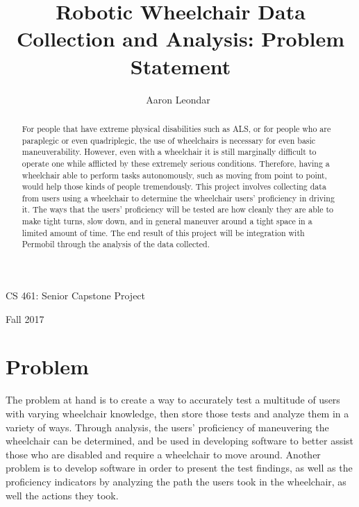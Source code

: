 \documentclass[10pt, onecolumn]{IEEEtran}
\title{Robotic Wheelchair Data Collection and Analysis: Problem Statement}
\author{
    Aaron Leondar\
}
\begin{document}
\begin{titlepage}
    \centering
    \maketitle
    CS 461: Senior Capstone Project\par
    \vspace{.5cm}
    Fall 2017\par
    \vspace{1.5cm}
    \begin{abstract}
        For people that have extreme physical disabilities such as ALS, or for people who are paraplegic or even quadriplegic, the use of wheelchairs is necessary for even basic maneuverability. However, even with a wheelchair it is still marginally difficult to operate one while afflicted by these extremely serious conditions. Therefore, having a wheelchair able to perform tasks autonomously, such as moving from point to point, would help those kinds of people tremendously. This project involves collecting data from users using a wheelchair to determine the wheelchair users' proficiency in driving it.  The ways that the users' proficiency will be tested are how cleanly they are able to make tight turns, slow down, and in general maneuver around a tight space in a limited amount of time. The end result of this project will be integration with Permobil through the analysis of the data collected.
    \end{abstract}
    \newpage  
\end{titlepage}

    \section{Problem}
    
    The problem at hand is to create a way to accurately test a multitude of users with varying wheelchair knowledge, then store those tests and analyze them in a variety of ways. Through analysis, the users' proficiency of maneuvering the wheelchair can be determined, and be used in developing software to better assist those who are disabled and require a wheelchair to move around. Another problem is to develop software in order to present the test findings, as well as the proficiency indicators by analyzing the path the users took in the wheelchair, as well the actions they took.
    
    \vspace{1cm}
   
\end{document}
